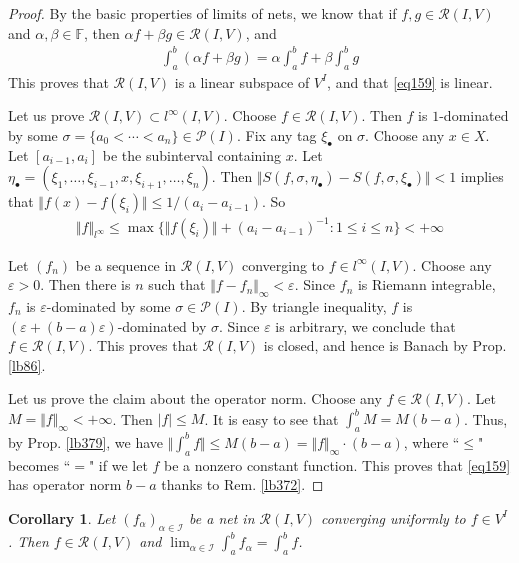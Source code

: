 \documentclass[12pt,b5paper,notitlepage]{article}
\theoremstyle{definition}
\theoremstyle{plain}
\newtheorem{co}[df]{Corollary}
\newcommand{\mc}{\mathcal}
\newcommand{\scr}{\mathscr}
\newcommand{\blt}{\bullet}
\newcommand{\Fbb}{\mathbb F}
\newcommand{\dps}{\displaystyle}
\newcommand{\eps}{\varepsilon}
\numberwithin{equation}{section}
\begin{document}
\begin{proof}
By the basic properties of limits of nets, we know that if $f,g\in\scr R(I,V)$ and $\alpha,\beta\in\Fbb$, then $\alpha f+\beta g\in\scr R(I,V)$, and
\begin{align}
\int_a^b (\alpha f+\beta g)=\alpha\int_a^b f+\beta\int_a^b g
\end{align}
This proves that $\scr R(I,V)$ is a linear subspace of $V^I$, and that \eqref{eq159} is linear. 

Let us prove $\scr R(I,V)\subset l^\infty(I,V)$. Choose $f\in\scr R(I,V)$. Then $f$ is $1$-dominated by some $\sigma=\{a_0<\cdots<a_n\}\in\mc P(I)$. Fix any tag $\xi_\blt$ on $\sigma$. Choose any $x\in X$. Let $[a_{i-1},a_i]$ be the subinterval containing $x$. Let $\eta_\blt=(\xi_1,\dots,\xi_{i-1},x,\xi_{i+1},\dots,\xi_n)$. Then $\Vert S(f,\sigma,\eta_\blt)-S(f,\sigma,\xi_\blt)\Vert<1$ implies that $\Vert f(x)-f(\xi_i)\Vert\leq 1/(a_i-a_{i-1})$. So
\begin{align*}
\Vert f\Vert_{l^\infty}\leq \max\big\{\Vert f(\xi_i)\Vert+(a_i-a_{i-1})^{-1}:1\leq i\leq n  \big\}<+\infty
\end{align*}

Let $(f_n)$ be a sequence in $\scr R(I,V)$ converging to $f\in l^\infty(I,V)$. Choose any $\eps>0$. Then there is $n$ such that $\Vert f-f_n\Vert_\infty<\eps$. Since $f_n$ is Riemann integrable, $f_n$ is $\eps$-dominated by some $\sigma\in\mc P(I)$. By triangle inequality, $f$ is $(\eps+(b-a)\eps)$-dominated by $\sigma$. Since $\eps$ is arbitrary, we conclude that $f\in\scr R(I,V)$. This proves that $\scr R(I,V)$ is closed, and hence is Banach by Prop. \ref{lb86}.

Let us prove the claim about the operator norm. Choose any $f\in\scr R(I,V)$. Let $M=\Vert f\Vert_\infty<+\infty$. Then $|f|\leq M$. It is easy to see that $\int_a^b M=M(b-a)$. Thus, by Prop. \ref{lb379}, we have $\Vert\int_a^b f\Vert\leq M(b-a)=\Vert f\Vert_\infty\cdot(b-a)$, where ``$\leq$" becomes ``$=$" if we let $f$ be a nonzero constant function. This proves that \eqref{eq159} has operator norm $b-a$ thanks to Rem. \ref{lb372}.
\end{proof}






\begin{co}\label{lb380}
Let $(f_\alpha)_{\alpha\in\scr I}$ be a net in $\scr R(I,V)$ converging uniformly to $f\in V^I$. Then $f\in\scr R(I,V)$ and $\dps\lim_{\alpha\in\scr I}\int_a^b f_\alpha=\int_a^b f$.
\end{co}
\end{document}
